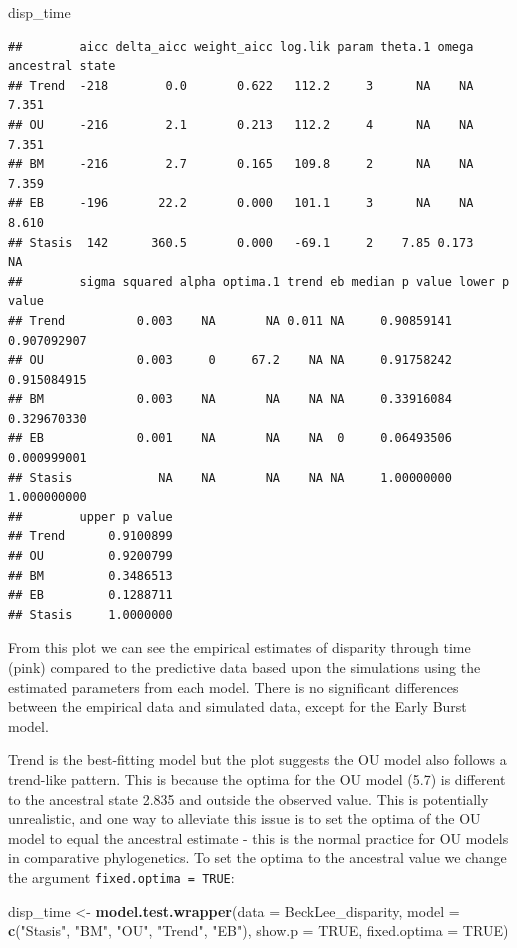 \documentclass[]{book}
\newenvironment{Shaded}{\begin{snugshade}}{\end{snugshade}}
\newcommand{\DataTypeTok}[1]{\textcolor[rgb]{0.13,0.29,0.53}{#1}}
\newcommand{\KeywordTok}[1]{\textcolor[rgb]{0.13,0.29,0.53}{\textbf{#1}}}
\newcommand{\NormalTok}[1]{#1}
\newcommand{\OtherTok}[1]{\textcolor[rgb]{0.56,0.35,0.01}{#1}}
\newcommand{\StringTok}[1]{\textcolor[rgb]{0.31,0.60,0.02}{#1}}
\begin{document}
\begin{Shaded}
\begin{Highlighting}[]
\NormalTok{disp_time}
\end{Highlighting}
\end{Shaded}

\begin{verbatim}
##        aicc delta_aicc weight_aicc log.lik param theta.1 omega ancestral state
## Trend  -218        0.0       0.622   112.2     3      NA    NA           7.351
## OU     -216        2.1       0.213   112.2     4      NA    NA           7.351
## BM     -216        2.7       0.165   109.8     2      NA    NA           7.359
## EB     -196       22.2       0.000   101.1     3      NA    NA           8.610
## Stasis  142      360.5       0.000   -69.1     2    7.85 0.173              NA
##        sigma squared alpha optima.1 trend eb median p value lower p value
## Trend          0.003    NA       NA 0.011 NA     0.90859141   0.907092907
## OU             0.003     0     67.2    NA NA     0.91758242   0.915084915
## BM             0.003    NA       NA    NA NA     0.33916084   0.329670330
## EB             0.001    NA       NA    NA  0     0.06493506   0.000999001
## Stasis            NA    NA       NA    NA NA     1.00000000   1.000000000
##        upper p value
## Trend      0.9100899
## OU         0.9200799
## BM         0.3486513
## EB         0.1288711
## Stasis     1.0000000
\end{verbatim}

From this plot we can see the empirical estimates of disparity through time (pink) compared to the predictive data based upon the simulations using the estimated parameters from each model.
There is no significant differences between the empirical data and simulated data, except for the Early Burst model.

Trend is the best-fitting model but the plot suggests the OU model also follows a trend-like pattern.
This is because the optima for the OU model (5.7) is different to the ancestral state 2.835 and outside the observed value.
This is potentially unrealistic, and one way to alleviate this issue is to set the optima of the OU model to equal the ancestral estimate - this is the normal practice for OU models in comparative phylogenetics.
To set the optima to the ancestral value we change the argument \texttt{fixed.optima\ =\ TRUE}:

\begin{Shaded}
\begin{Highlighting}[]
\NormalTok{disp_time <-}\StringTok{ }\KeywordTok{model.test.wrapper}\NormalTok{(}\DataTypeTok{data =}\NormalTok{ BeckLee_disparity,}
                    \DataTypeTok{model =} \KeywordTok{c}\NormalTok{(}\StringTok{"Stasis"}\NormalTok{, }\StringTok{"BM"}\NormalTok{, }\StringTok{"OU"}\NormalTok{, }\StringTok{"Trend"}\NormalTok{, }\StringTok{"EB"}\NormalTok{),}
                                \DataTypeTok{show.p =} \OtherTok{TRUE}\NormalTok{, }\DataTypeTok{fixed.optima =} \OtherTok{TRUE}\NormalTok{)}
\end{Highlighting}
\end{Shaded}
\end{document}
